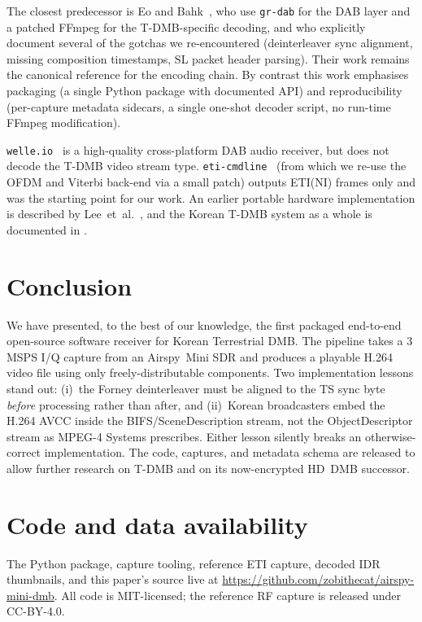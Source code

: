\documentclass[11pt,a4paper]{article}
\begin{document}
The closest predecessor is Eo and Bahk~\cite{eo2024tdmb}, who use
\texttt{gr-dab} for the DAB layer and a patched FFmpeg for the
T-DMB-specific decoding, and who explicitly document several of the
gotchas we re-encountered (deinterleaver sync alignment, missing
composition timestamps, SL packet header parsing).  Their work
remains the canonical reference for the encoding chain.  By contrast
this work emphasises packaging (a single Python package with
documented API) and reproducibility (per-capture metadata sidecars,
a single one-shot decoder script, no run-time FFmpeg modification).

\texttt{welle.io}~\cite{welleio} is a high-quality cross-platform DAB
audio receiver, but does not decode the T-DMB video stream type.
\texttt{eti-cmdline}~\cite{etistuff} (from which we re-use the OFDM
and Viterbi back-end via a small patch) outputs ETI(NI) frames only
and was the starting point for our work.  An earlier portable hardware
implementation is described by Lee~et~al.~\cite{lee2007portable},
and the Korean T-DMB system as a whole is documented in
\cite{ttak0026,etsi102427,etsi102428,hwang2015simulator,iso14496-1}.

\section{Conclusion}\label{sec:conclusion}

We have presented, to the best of our knowledge, the first packaged
end-to-end open-source software receiver for Korean Terrestrial DMB.
The pipeline takes a 3\,MSPS I/Q capture from an Airspy~Mini SDR and
produces a playable H.264 video file using only freely-distributable
components.  Two implementation lessons stand out: (i)~the Forney
deinterleaver must be aligned to the TS sync byte \emph{before}
processing rather than after, and (ii)~Korean broadcasters embed the
H.264 AVCC inside the BIFS/SceneDescription stream, not the
ObjectDescriptor stream as MPEG-4 Systems prescribes.  Either lesson
silently breaks an otherwise-correct implementation.  The code,
captures, and metadata schema are released to allow further research
on T-DMB and on its now-encrypted HD~DMB successor.

\section*{Code and data availability}
The Python package, capture tooling, reference ETI capture, decoded
IDR thumbnails, and this paper's source live at
\url{https://github.com/zobithecat/airspy-mini-dmb}.  All code is MIT-licensed;
the reference RF capture is released under CC-BY-4.0.
\end{document}
